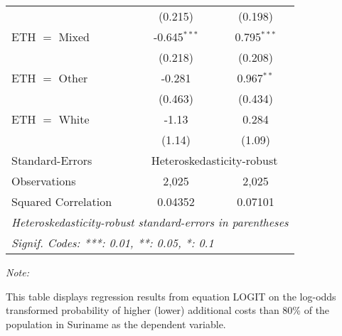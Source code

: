\begin{table}[htbp!]
\begin{adjustbox}{width = 1\textwidth, max height = 0.95\textheight, center}
\begin{threeparttable}[b]
\begin{tabular}{lcc}
                                          & (0.215)        & (0.198)\\   
            ETH $=$ Mixed                 & -0.645$^{***}$ & 0.795$^{***}$\\   
                                          & (0.218)        & (0.208)\\   
            ETH $=$ Other                 & -0.281         & 0.967$^{**}$\\   
                                          & (0.463)        & (0.434)\\   
            ETH $=$ White                 & -1.13          & 0.284\\   
                                          & (1.14)         & (1.09)\\   
            \midrule 
            Standard-Errors & \multicolumn{2}{c}{Heteroskedasticity-robust} \\ 
            Observations                  & 2,025          & 2,025\\  
            Squared Correlation           & 0.04352        & 0.07101\\  
            \midrule \midrule
            \multicolumn{3}{l}{\emph{Heteroskedasticity-robust standard-errors in parentheses}}\\
            \multicolumn{3}{l}{\emph{Signif. Codes: ***: 0.01, **: 0.05, *: 0.1}}\\
         \end{tabular}
         
         \begin{tablenotes}\item \medskip \textit{Note:}
            \item This table displays regression results from equation LOGIT on the log-odds transformed probability of higher (lower) additional costs than 80\% of the population in Suriname as the dependent variable. 
         \end{tablenotes}
      \end{threeparttable}
   \end{adjustbox}
\end{table}


